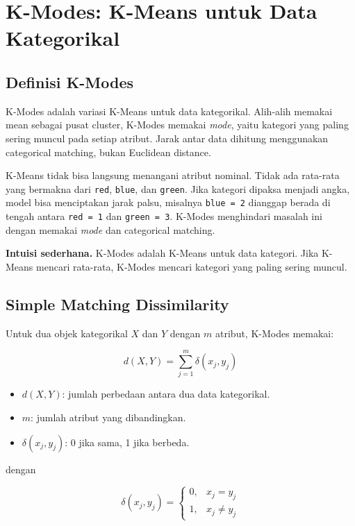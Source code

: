 \documentclass{article}
\newcommand{\code}[1]{\texttt{#1}}
\newcommand{\infobox}[2]{%
  \par\vspace{0.6em}
  \noindent\colorbox{#1}{%
    \begin{minipage}{0.96\textwidth}
    \vspace{0.65em}
    #2
    \vspace{0.65em}
    \end{minipage}}
  \par\vspace{0.8em}
}
\begin{document}
\section{K-Modes: K-Means untuk Data Kategorikal}

\subsection{Definisi K-Modes}

\noindent K-Modes adalah variasi K-Means untuk data kategorikal. Alih-alih memakai mean sebagai pusat cluster, K-Modes memakai \textit{mode}, yaitu kategori yang paling sering muncul pada setiap atribut. Jarak antar data dihitung menggunakan categorical matching, bukan Euclidean distance.

K-Means tidak bisa langsung menangani atribut nominal. Tidak ada rata-rata yang bermakna dari \code{red}, \code{blue}, dan \code{green}. Jika kategori dipaksa menjadi angka, model bisa menciptakan jarak palsu, misalnya \code{blue = 2} dianggap berada di tengah antara \code{red = 1} dan \code{green = 3}. K-Modes menghindari masalah ini dengan memakai \textit{mode} dan categorical matching.
\infobox{softGreen}{\textbf{Intuisi sederhana.} K-Modes adalah K-Means untuk data kategori. Jika K-Means mencari rata-rata, K-Modes mencari kategori yang paling sering muncul.}

\subsection{Simple Matching Dissimilarity}

Untuk dua objek kategorikal $X$ dan $Y$ dengan $m$ atribut, K-Modes memakai:

\begin{equation}
d(X,Y) = \sum_{j=1}^{m} \delta(x_j, y_j)
\end{equation}
\begin{itemize}[leftmargin=*]
    \item $d(X,Y)$: jumlah perbedaan antara dua data kategorikal.
    \item $m$: jumlah atribut yang dibandingkan.
    \item $\delta(x_j,y_j)$: 0 jika sama, 1 jika berbeda.
\end{itemize}
dengan

\begin{equation}
\delta(x_j,y_j) =
\begin{cases}
0, & x_j = y_j \\
1, & x_j \ne y_j
\end{cases}
\end{equation}
\end{document}
